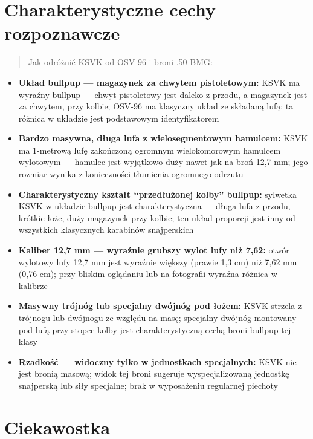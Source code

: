 \documentclass[12pt,openany,oneside]{book}
\providecommand{\tightlist}{%
  \setlength{\itemsep}{0pt}\setlength{\parskip}{0pt}}
\begin{document}
\section{Charakterystyczne cechy
rozpoznawcze}\label{charakterystyczne-cechy-rozpoznawcze-65}

\begin{quote}
Jak odróżnić KSVK od OSV-96 i broni .50 BMG:
\end{quote}

\begin{itemize}
\tightlist
\item
  \textbf{Układ bullpup --- magazynek za chwytem pistoletowym:} KSVK ma
  wyraźny bullpup --- chwyt pistoletowy jest daleko z przodu, a
  magazynek jest za chwytem, przy kolbie; OSV-96 ma klasyczny układ ze
  składaną lufą; ta różnica w układzie jest podstawowym identyfikatorem
\item
  \textbf{Bardzo masywna, długa lufa z wielosegmentowym hamulcem:} KSVK
  ma 1-metrową lufę zakończoną ogromnym wielokomorowym hamulcem
  wylotowym --- hamulec jest wyjątkowo duży nawet jak na broń 12,7 mm;
  jego rozmiar wynika z konieczności tłumienia ogromnego odrzutu
\item
  \textbf{Charakterystyczny kształt ``przedłużonej kolby'' bullpup:}
  sylwetka KSVK w układzie bullpup jest charakterystyczna --- długa lufa
  z przodu, krótkie łoże, duży magazynek przy kolbie; ten układ
  proporcji jest inny od wszystkich klasycznych karabinów snajperskich
\item
  \textbf{Kaliber 12,7 mm --- wyraźnie grubszy wylot lufy niż 7,62:}
  otwór wylotowy lufy 12,7 mm jest wyraźnie większy (prawie 1,3 cm) niż
  7,62 mm (0,76 cm); przy bliskim oglądaniu lub na fotografii wyraźna
  różnica w kalibrze
\item
  \textbf{Masywny trójnóg lub specjalny dwójnóg pod łożem:} KSVK strzela
  z trójnogu lub dwójnogu ze względu na masę; specjalny dwójnóg
  montowany pod lufą przy stopce kolby jest charakterystyczną cechą
  broni bullpup tej klasy
\item
  \textbf{Rzadkość --- widoczny tylko w jednostkach specjalnych:} KSVK
  nie jest bronią masową; widok tej broni sugeruje wyspecjalizowaną
  jednostkę snajperską lub siły specjalne; brak w wyposażeniu regularnej
  piechoty
\end{itemize}

\section{Ciekawostka}\label{ciekawostka-65}
\end{document}
